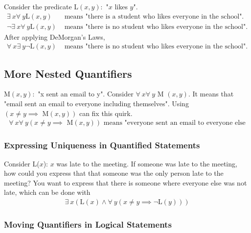 \noindent Consider the predicate L$(x,y):$ "$x$ likes $y$".
\begin{align*}
  \exists~ x \forall~ y \text{L}(x, y)       & \text{ means "there is a student who likes everyone in the school".}  \\
  \lnot \exists~ x \forall~ y \text{L}(x, y) & \text{ means "there is no student who likes everyone in the school".}
\end{align*}
After applying DeMorgan's Laws,
\begin{align*}
  \forall~ x \exists~ y \lnot \text{L}(x, y) & \text{ means "there is no student who likes everyone in the school".}
\end{align*}

\subsection{More Nested Quantifiers}

M$(x, y):$ "x sent an email to y". Consider $\forall~ x \forall~ y$ M $(x, y)$.
It means that "email sent an email to everyone including themselves".
Using $( x \not = y \implies \text{ M}(x, y))$ can fix this quirk.
\begin{align*}
  \forall~ x \forall~ y (x \not = y \implies \text{ M}(x, y))
  \text{ means "everyone sent an email to everyone else}
\end{align*}

\subsubsection*{Expressing Uniqueness in Quantified Statements}

Consider L($x$): $x$ was late to the meeting. If someone was late to the meeting,
how could you express that that someone was the only person late to the meeting?
You want to express that there is someone where everyone else was not late, which
can be done with
\begin{align*}
  \exists~ x (\text{L}(x) \land \forall~ y (x \not = y \implies \lnot \text{L}(y)))
\end{align*}

\subsubsection*{Moving Quantifiers in Logical Statements}

